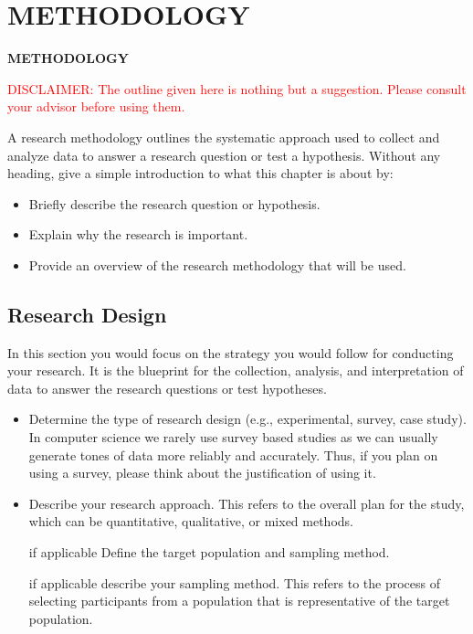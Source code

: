 \chapter{METHODOLOGY}
\pagebreak

\begin{center}
{\LARGE\textbf{METHODOLOGY}}
\end{center}

\textcolor{red}{DISCLAIMER: The outline given here is nothing but a suggestion. Please consult your advisor before using them.}

A research methodology outlines the systematic approach used to collect and analyze data to answer a research question or test a hypothesis. Without any heading, give a simple introduction to what this chapter is about by:
\begin{itemize}
    \item Briefly describe the research question or hypothesis.
    \item Explain why the research is important.
    \item Provide an overview of the research methodology that will be used.
\end{itemize}


\section{Research Design} %
\label{sec:research_design}

In this section you would focus on the strategy you would follow for conducting your research. 
It is the blueprint for the collection, analysis, and interpretation of data to answer the research questions or test hypotheses.

\begin{itemize}
    \item Determine the type of research design (e.g., experimental, survey, case study). In computer science we rarely use survey based studies as we can usually generate tones of data more reliably and accurately. Thus, if you plan on using a survey, please think about the justification of using it.
    \item Describe your research approach. This refers to the overall plan for the study, which can be quantitative, qualitative, or mixed methods.
    \item [if applicable] Define the target population and sampling method.
    \item [if applicable] describe your sampling method. This refers to the process of selecting participants from a population that is representative of the target population.
\end{itemize}

